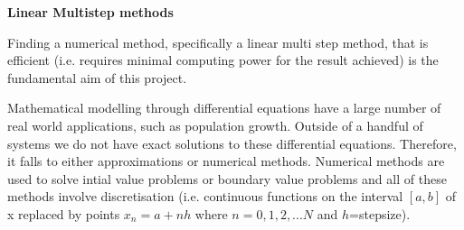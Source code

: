 \documentclass[12pt]{article}
\begin{document}

\begin{center}
{\bf Linear Multistep methods }
\end{center}


Finding a numerical method, specifically a linear multi step method, that is efficient (i.e. requires minimal computing power for the result achieved) is the fundamental aim of this project.

Mathematical modelling through differential equations have a large number of real world applications, such as population growth. Outside of a handful of systems we do not have exact solutions to these differential equations. Therefore, it falls to either approximations or numerical methods. Numerical methods are used to solve intial value problems or boundary value problems and all of these methods involve discretisation (i.e. continuous functions on the interval $[a,b]$ of x replaced by points $x_{n}=a+nh$ where $n=0,1,2,...N$ and $h$=stepsize).\\
\end{document}
